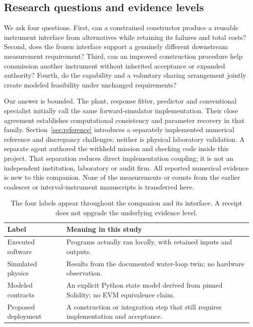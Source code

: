 \documentclass[11pt,letterpaper]{article}
\begin{document}
\subsection{Research questions and evidence levels}
We ask four questions. First, can a constrained constructor produce a reusable instrument interface from alternatives while retaining its failures and total costs? Second, does the frozen interface support a genuinely different downstream measurement requirement? Third, can an improved construction procedure help commission another instrument without inherited acceptance or expanded authority? Fourth, do the capability and a voluntary sharing arrangement jointly create modeled feasibility under unchanged requirements?

Our answer is bounded. The plant, response fitter, predictor and conventional specialist initially call the same forward-simulator implementation. Their close agreement establishes computational consistency and parameter recovery in that family. Section~\ref{sec:reference} introduces a separately implemented numerical reference and discrepancy challenges; neither is physical laboratory validation. A separate agent authored the withheld mission and checking code inside this project. That separation reduces direct implementation coupling; it is not an independent institution, laboratory or audit firm. All reported numerical evidence is new to this companion. None of the measurements or counts from the earlier coalescer or interval-instrument manuscripts is transferred here.

\begin{table}[ht]
\centering\small
\begin{tabularx}{\linewidth}{@{}p{.23\linewidth}X@{}}
\toprule
Label & Meaning in this study\\\midrule
Executed software & Programs actually ran locally, with retained inputs and outputs.\\
Simulated physics & Results from the documented water-loop twin; no hardware observation.\\
Modeled contracts & An explicit Python state model derived from pinned Solidity; no EVM equivalence claim.\\
Proposed deployment & A construction or integration step that still requires implementation and acceptance.\\\bottomrule
\end{tabularx}
\caption{The four labels appear throughout the companion and its interface. A receipt does not upgrade the underlying evidence level.}
\end{table}
\end{document}
